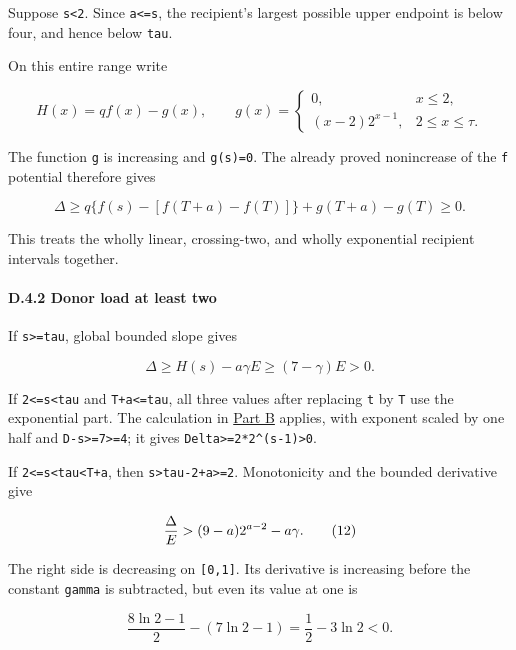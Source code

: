 Suppose \texttt{s\textless{}2}. Since \texttt{a\textless{}=s}, the recipient's largest possible upper endpoint is below four, and hence below \texttt{tau}.

On this entire range write

\[
H(x)=qf(x)-g(x),\qquad
g(x)=\begin{cases}0,&x\le2,\\
                   (x-2)2^{x-1},&2\le x\le\tau.
      \end{cases}                               \tag{10}
\]

The function \texttt{g} is increasing and \texttt{g(s)=0}. The already proved nonincrease of the \texttt{f} potential therefore gives

\[
\Delta\ge q\{f(s)-[f(T+a)-f(T)]\}
                     +g(T+a)-g(T)\ge0.          \tag{11}
\]

This treats the wholly linear, crossing-two, and wholly exponential recipient intervals together.

\hypertarget{af-385fd70686-d.4.2-donor-load-at-least-two}{%
\paragraph{D.4.2 Donor load at least two}\label{af-385fd70686-d.4.2-donor-load-at-least-two}}

If \texttt{s\textgreater{}=tau}, global bounded slope gives

\[
\Delta\ge H(s)-a\gamma E\ge(7-\gamma)E>0.
\]

If \texttt{2\textless{}=s\textless{}tau} and \texttt{T+a\textless{}=tau}, all three values after replacing \texttt{t} by \texttt{T} use the exponential part. The calculation in \protect\hyperlink{af-385fd70686-exponential-moment}{Part B} applies, with exponent scaled by one half and \texttt{D-s\textgreater{}=7\textgreater{}=4}; it gives \texttt{Delta\textgreater{}=2*2\^{}(s-1)\textgreater{}0}.

If \texttt{2\textless{}=s\textless{}tau\textless{}T+a}, then \texttt{s\textgreater{}tau-2+a\textgreater{}=2}. Monotonicity and the bounded derivative give

\[
{\Delta\over E}
>(9-a)2^{a-2}-a\gamma.                           \tag{12}
\]

The right side is decreasing on \texttt{{[}0,1{]}}. Its derivative is increasing before the constant \texttt{gamma} is subtracted, but even its value at one is

\[
\frac{8\ln2-1}{2}-(7\ln2-1)=\frac12-3\ln2<0.
\]

